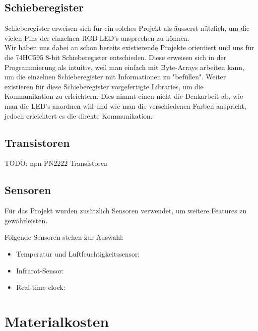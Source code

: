 \documentclass[12pt,a4paper]{article}
\begin{document}
\subsection{Schieberegister}

Schieberegister erweisen sich für ein solches Projekt als äusserst nützlich, um die vielen Pins der einzelnen RGB LED's ansprechen zu können. \\

Wir haben uns dabei an schon bereits existierende Projekte orientiert und uns für die 74HC595 8-bit Schieberegister entschieden. Diese erweisen sich in der Programmierung als intuitiv, weil man einfach mit Byte-Arrays arbeiten kann, um die einzelnen Schieberegister mit Informationen zu "befüllen". Weiter existieren für diese Schieberegister vorgefertigte Libraries, um die Kommunikation zu erleichtern. Dies nimmt einen nicht die Denkarbeit ab, wie man die LED's anordnen will und wie man die verschiedenen Farben anspricht, jedoch erleichtert es die direkte Kommunikation.

\subsection{Transistoren}

TODO: npn PN2222 Transistoren

\subsection{Sensoren}

Für das Projekt wurden zusätzlich Sensoren verwendet, um weitere Features zu gewährleisten.

Folgende Sensoren stehen zur Auswahl:
\begin{itemize}
    \item Temperatur und Luftfeuchtigkeitssensor:
    \item Infrarot-Sensor:
    \item Real-time clock:
\end{itemize}

\section{Materialkosten}
\end{document}
